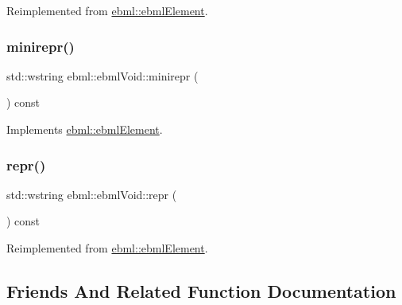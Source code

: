 Reimplemented from \mbox{\hyperlink{classebml_1_1ebmlElement_ad493e4103807b8d4434c0667c148dcea}{ebml\+::ebml\+Element}}.

\mbox{\label{classebml_1_1ebmlVoid_ad9baeb00b771d3ae4cdebb2078f863ad}} 
\subsubsection{\texorpdfstring{minirepr()}{minirepr()}}
{\footnotesize\ttfamily std\+::wstring ebml\+::ebml\+Void\+::minirepr (\begin{DoxyParamCaption}{ }\end{DoxyParamCaption}) const\hspace{0.3cm}{\ttfamily [virtual]}}



Implements \mbox{\hyperlink{classebml_1_1ebmlElement_a7852173aeef78bd843939ae5a82f1d1c}{ebml\+::ebml\+Element}}.

\mbox{\label{classebml_1_1ebmlVoid_a54f5a77bc4029d77d0a456fa8dcb53ef}} 
\subsubsection{\texorpdfstring{repr()}{repr()}}
{\footnotesize\ttfamily std\+::wstring ebml\+::ebml\+Void\+::repr (\begin{DoxyParamCaption}{ }\end{DoxyParamCaption}) const\hspace{0.3cm}{\ttfamily [virtual]}}



Reimplemented from \mbox{\hyperlink{classebml_1_1ebmlElement_a77865a71f4bab782817ec82e88fb5198}{ebml\+::ebml\+Element}}.



\subsection{Friends And Related Function Documentation}
\mbox{\label{classebml_1_1ebmlVoid_ac7fd92f117d3b9c559a6d1725f579f9b}} 
